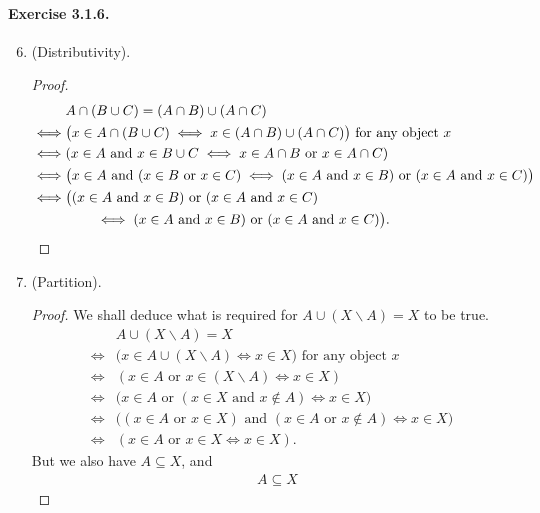 \paragraph{Exercise 3.1.6.}
\begin{enumerate}\setcounter{enumi}{5}
    \item (Distributivity).
    \begin{proof}
        \begin{align*}
            &A \cap (B \cup C) = (A \cap B) \cup (A \cap C) 
            \\\iff& \big(x\in A \cap (B \cup C) \iff x\in (A \cap B) \cup (A \cap C) \big) \text{ for any object $x$}
            \\\iff& (x\in A \text{ and } x \in B \cup C \iff x \in A \cap B \text{ or } x \in A \cap C)
            \\\iff& \big(x\in A \text{ and } (x \in B \text{ or } x \in C) \iff (x \in A \text{ and } x \in B) \text{ or } (x \in A \text{ and } x \in C) \big)
            \\\iff& \big( (x \in A \text{ and } x \in B) \text{ or } (x \in A \text{ and } x \in C) 
            \\ &\qquad\iff (x \in A \text{ and } x \in B) \text{ or } (x \in A \text{ and } x \in C) \big). \qedhere
        \end{align*}
    \end{proof}
    \item (Partition).
    \begin{proof}
        We shall deduce what is required for $A \cup (X \backslash A) = X$ to be true.
        \begin{align*}
            & A \cup (X \backslash A) = X
            \\\iff& \big( x \in A \cup (X \backslash A) \iff x \in X \big) \text{ for any object $x$}
            \\\iff& ( x \in A \text{ or } x \in (X \backslash A) \iff x \in X )
            \\\iff& \big( x \in A \text{ or } (x \in X \text{ and } x \notin A) \iff x \in X \big)
            \\\iff& \big( (x \in A \text{ or } x \in X) \text{ and } (x \in A \text{ or } x \notin A) \iff x \in X \big)
            \\\iff& ( x \in A \text{ or } x \in X \iff x \in X ).
        \end{align*}
        But we also have $A \subseteq X$, and
        \begin{align*}
            & A \subseteq X

\end{align*}
\end{proof}
\end{enumerate}
